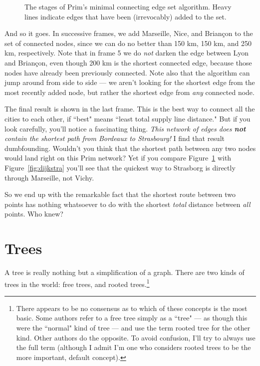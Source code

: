 \begin{figure}[ht]
\begin{custommargins}{-2.4cm}{-2.8cm}

\caption{The stages of Prim's minimal connecting edge set algorithm. Heavy
lines indicate edges that have been (irrevocably) added to the set.}
\label{prim}
\end{custommargins}
\end{figure}

\afterpage{\clearpage}

And so it goes. In successive frames, we add Marseille, Nice, and
Brian\c{c}on to the set of connected nodes, since we can do no better than
150 km, 150 km, and 250 km, respectively. Note that in frame 5 we do
\textit{not} darken the edge between Lyon and Brian\c{c}on, even though 200
km is the shortest connected edge, because those nodes have already been
previously connected. Note also that the algorithm can jump around from
side to side --- we aren't looking for the shortest edge from the most
recently added node, but rather the shortest edge from \textit{any}
connected node.

The final result is shown in the last frame. This is the best way to
connect all the cities to each other, if ``best" means ``least total supply
line distance." But if you look carefully, you'll notice a fascinating
thing. \textit{This network of edges does \textbf{not} contain the shortest
path from Bordeaux to Strasbourg!} I find that result dumbfounding.
Wouldn't you think that the shortest path between any two nodes would land
right on this Prim network? Yet if you compare Figure~\ref{prim} with
Figure~\ref{fig:dijkstra} you'll see that the quickest way to Strasborg is
directly through Marseille, not Vichy.

So we end up with the remarkable fact that the shortest route between two
points has nothing whatsoever to do with the shortest \textit{total}
distance between \textit{all} points. Who knew?






\section{Trees}

A tree is really nothing but a simplification of a graph. There are two
kinds of trees in the world: free trees, and rooted trees.\footnote{There
appears to be no consensus as to which of these concepts is the most basic.
Some authors refer to a free tree simply as a ``tree" --- as though this
were the ``normal" kind of tree --- and use the term rooted tree for the
other kind. Other authors do the opposite. To avoid confusion, I'll try to
always use the full term (although I admit I'm one who considers rooted
trees to be the more important, default concept).}

